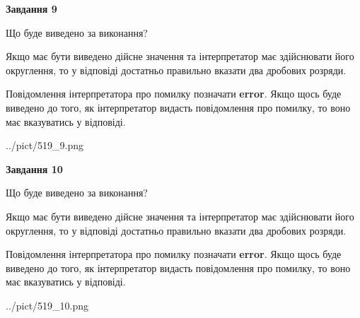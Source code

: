 \documentclass[12pt, ukrainian]{article}
\begin{document}
{\begin {Large}
{\begin {center}\textbf{Завдання 9}\end {center}}\par
Що буде виведено за виконання? \par

Якщо має бути виведено дійсне значення та інтерпретатор має здійснювати його округлення, 
то у відповіді достатньо правильно вказати два дробових розряди.

Повідомлення інтерпретатора про помилку позначати \textbf{error}.
Якщо щось буде виведено до того, як інтерпретатор видасть повідомлення про помилку, 
то воно має вказуватись у відповіді. \par

\begin{center}
	{../pict/519_9.png}
\end{center}
\newpage

{\begin {center}\textbf{Завдання 10}\end {center}}\par
Що буде виведено за виконання? \par

Якщо має бути виведено дійсне значення та інтерпретатор має здійснювати його округлення, 
то у відповіді достатньо правильно вказати два дробових розряди.

Повідомлення інтерпретатора про помилку позначати \textbf{error}.
Якщо щось буде виведено до того, як інтерпретатор видасть повідомлення про помилку, 
то воно має вказуватись у відповіді. \par

\begin{center}
	{../pict/519_10.png}
\end{center}
\newpage

\end {Large}}
\end{document}
